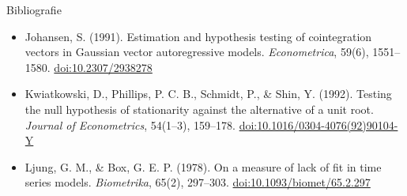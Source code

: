 \begin{frame}{Bibliografie}
\begin{itemize}
    \item Johansen, S. (1991). Estimation and hypothesis testing of cointegration vectors in Gaussian vector autoregressive models. \textit{Econometrica}, 59(6), 1551--1580. \href{https://doi.org/10.2307/2938278}{doi:10.2307/2938278}
    \item Kwiatkowski, D., Phillips, P. C. B., Schmidt, P., \& Shin, Y. (1992). Testing the null hypothesis of stationarity against the alternative of a unit root. \textit{Journal of Econometrics}, 54(1--3), 159--178. \href{https://doi.org/10.1016/0304-4076(92)90104-Y}{doi:10.1016/0304-4076(92)90104-Y}
    \item Ljung, G. M., \& Box, G. E. P. (1978). On a measure of lack of fit in time series models. \textit{Biometrika}, 65(2), 297--303. \href{https://doi.org/10.1093/biomet/65.2.297}{doi:10.1093/biomet/65.2.297}
\end{itemize}
\end{frame}



